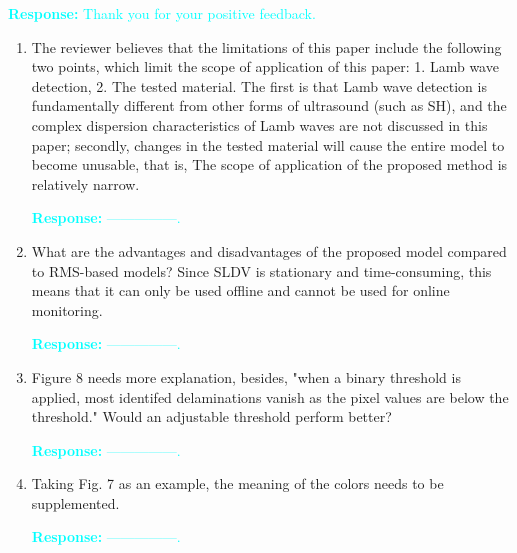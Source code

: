 \documentclass[11pt,a2paper]{report}
\begin{document}
\textcolor{Cyan}{
	\newline\textbf{Response:}
	Thank you for your positive feedback.
}
\begin{enumerate}
	\item The reviewer believes that the limitations of this paper include the 
	following two points, which limit the scope of application of this paper: 
	1. Lamb wave detection, 2. The tested material. The first is that Lamb wave 
	detection is fundamentally different from other forms of ultrasound (such 
	as SH), and the complex dispersion characteristics of Lamb waves are not 
	discussed in this paper; secondly, changes in the tested material will 
	cause the entire model to become unusable, that is, The scope of 
	application of the proposed method is relatively narrow.
	
	\textcolor{Cyan}{
		\textbf{Response:}
		---------------.
	}
	
	\item What are the advantages and disadvantages of the proposed model 
	compared to RMS-based models? Since SLDV is stationary and time-consuming, 
	this means that it can only be used offline and cannot be used for online 
	monitoring.
	
	\textcolor{Cyan}{
		\textbf{Response:}
		---------------.
	}
	\item Figure 8 needs more explanation, besides, "when a binary threshold is 
	applied, most identifed delaminations vanish as the pixel values are below 
	the threshold." Would an adjustable threshold perform better?
	
	\textcolor{Cyan}{
		\textbf{Response:}
		---------------.
	}
	
	\item Taking Fig. 7 as an example, the meaning of the colors needs to be 
	supplemented.
	
	\textcolor{Cyan}{
		\textbf{Response:}
		---------------.
	}	
	
\end{enumerate}	
\end{document}

